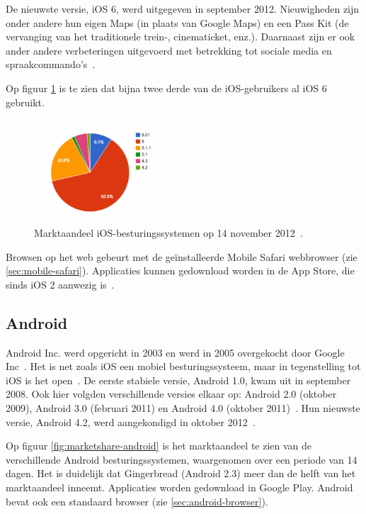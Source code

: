 De nieuwste versie, iOS 6, werd uitgegeven in september 2012. Nieuwigheden zijn onder andere hun eigen Maps (in plaats van Google Maps) en een Pass Kit (de vervanging van het traditionele trein-, cinematicket, enz.). Daarnaast zijn er ook ander andere verbeteringen uitgevoerd met betrekking tot sociale media en spraakcommando's~\cite{Deitel2012}.

Op figuur \ref{fig:marketshare-ios} is te zien dat bijna twee derde van de iOS-gebruikers al iOS 6 gebruikt.

\begin{figure}
  \centering
  \includegraphics[width=0.5\textwidth]{figuren/marketshare-ios-2012-11-14.png}
  \caption{Marktaandeel iOS-besturingssystemen op 14 november 2012~\cite{Sylvain2012}.}
  \label{fig:marketshare-ios}
\end{figure}

Browsen op het web gebeurt met de geïnstalleerde Mobile Safari webbrowser (zie \ref{sec:mobile-safari}). Applicaties kunnen gedownload worden in de App Store, die sinds iOS 2 aanwezig is~\cite{Deitel2012}. 

\subsection{Android}
Android Inc. werd opgericht in 2003 en werd in 2005 overgekocht door Google Inc~\cite{Satyesh2012}. Het is net zoals iOS een mobiel besturingssysteem, maar in tegenstelling tot iOS is het open~\cite{David2011}. De eerste stabiele versie, Android 1.0, kwam uit in september 2008. Ook hier volgden verschillende versies elkaar op: Android 2.0 (oktober 2009), Android 3.0 (februari 2011) en Android 4.0 (oktober 2011)~\cite{Satyesh2012}. Hun nieuwste versie, Android 4.2, werd aangekondigd in oktober 2012~\cite{Sawers2012}. 

Op figuur \ref{fig:marketshare-android} is het marktaandeel te zien van de verschillende Android besturingssystemen, waargenomen over een periode van 14 dagen. Het is duidelijk dat Gingerbread (Android 2.3) meer dan de helft van het marktaandeel inneemt.
Applicaties worden gedownload in Google Play. Android bevat ook een standaard browser (zie \ref{sec:android-browser}).

